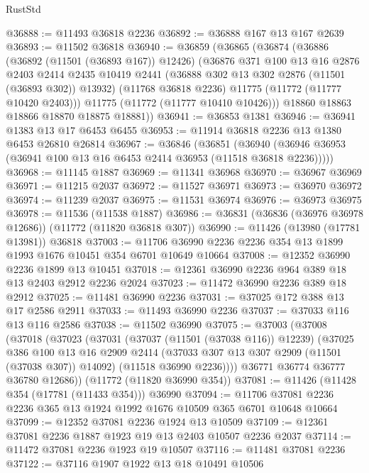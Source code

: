 \begin{lexlean}{RustStd}
\begin{coremodule}
@36888 := @11493 @36818 @2236
@36892 := @36888 @167 @13 @167 @2639
@36893 := @11502 @36818
@36940 := @36859
    (@36865
      (@36874
        (@36886
          (@36892 (@11501 (@36893 @167)) @12426)
          (@36876
            @371
            @100
            @13
            @16
            @2876
            @2403
            @2414
            @2435
            @10419
            @2441
            (@36888 @302 @13 @302 @2876 (@11501 (@36893 @302)) @13932)
            (@11768 @36818 @2236)
            @11775
            (@11772 (@11777 @10420 @2403)))
          @11775
          (@11772 (@11777 @10410 @10426)))
        @18860
        @18863
        @18866
        @18870
        @18875
        @18881))
@36941 := @36853 @1381
@36946 := @36941 @1383 @13 @17 @6453 @6455
@36953 := @11914 @36818 @2236 @13 @1380 @6453 @26810 @26814
@36967 := @36846
    (@36851 (@36940 (@36946 @36953 (@36941 @100 @13 @16 @6453 @2414 @36953 (@11518 @36818 @2236)))))
@36968 := @11145 @1887
@36969 := @11341 @36968
@36970 := @36967 @36969
@36971 := @11215 @2037
@36972 := @11527 @36971
@36973 := @36970 @36972
@36974 := @11239 @2037
@36975 := @11531 @36974
@36976 := @36973 @36975
@36978 := @11536 (@11538 @1887)
@36986 := @36831 (@36836 (@36976 @36978 @12686)) (@11772 (@11820 @36818 @307))
@36990 := @11426 (@13980 (@17781 @13981)) @36818
@37003 := @11706 @36990 @2236 @2236 @354 @13 @1899 @1993 @1676 @10451 @354 @6701 @10649 @10664
@37008 := @12352 @36990 @2236 @1899 @13 @10451
@37018 := @12361 @36990 @2236 @964 @389 @18 @13 @2403 @2912 @2236 @2024
@37023 := @11472 @36990 @2236 @389 @18 @2912
@37025 := @11481 @36990 @2236
@37031 := @37025 @172 @388 @13 @17 @2586 @2911
@37033 := @11493 @36990 @2236
@37037 := @37033 @116 @13 @116 @2586
@37038 := @11502 @36990
@37075 := @37003
    (@37008
      (@37018
        (@37023
          (@37031
            (@37037 (@11501 (@37038 @116)) @12239)
            (@37025
              @386
              @100
              @13
              @16
              @2909
              @2414
              (@37033 @307 @13 @307 @2909 (@11501 (@37038 @307)) @14092)
              (@11518 @36990 @2236))))
        @36771
        @36774
        @36777
        @36780
        @12686))
    (@11772 (@11820 @36990 @354))
@37081 := @11426 (@11428 @354 (@17781 (@11433 @354))) @36990
@37094 := @11706 @37081 @2236 @2236 @365 @13 @1924 @1992 @1676 @10509 @365 @6701 @10648 @10664
@37099 := @12352 @37081 @2236 @1924 @13 @10509
@37109 := @12361 @37081 @2236 @1887 @1923 @19 @13 @2403 @10507 @2236 @2037
@37114 := @11472 @37081 @2236 @1923 @19 @10507
@37116 := @11481 @37081 @2236
@37122 := @37116 @1907 @1922 @13 @18 @10491 @10506

\end{coremodule}
\end{lexlean}
